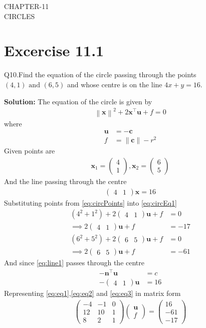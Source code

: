 \documentclass[12pt]{article}
\providecommand{\brak}[1]{\ensuremath{\left(#1\right)}}
\providecommand{\norm}[1]{\left\lVert#1\right\rVert}
\newcommand{\solution}{\noindent \textbf{Solution: }}
\newcommand{\myvec}[1]{\ensuremath{\begin{pmatrix}#1\end{pmatrix}}}
\let\vec\mathbf
\begin{document}
\begin{center}
\textbf\large{CHAPTER-11 \\ CIRCLES}

\end{center}
\section*{Excercise 11.1}

Q10.Find the equation of the circle passing through the points $\brak{4,1} \text{ and } \brak{6,5}$ and whose centre is on the line $4x + y = 16$.

\solution
The equation of the circle is given by
\begin{align}
	\label{eq:circEq1}
	\norm{\vec{x}}^2 + 2\vec{x}^\top \vec{u} + f = 0
\end{align}
where
\begin{align}
	\vec{u} &= -\vec{c}\\
	      f &= \norm{\vec{c}} - r^2
\end{align}
Given points are
\begin{align}
	\label{eq:circPoints}
	\vec{x}_{1} = \myvec{4\\1} , \vec{x}_{2} = \myvec{6\\5}
\end{align}
And the line passing through the centre
\begin{align}
	\label{eq:line1}
	\myvec{4 & 1}\vec{x} = 16
\end{align}
Substituting points from \eqref{eq:circPoints} into \eqref{eq:circEq1}
\begin{align}
	\brak{4^2 + 1^2}+2\myvec{4 & 1}\vec{u}+f&=0\\
	\label{eq:eq1}	
	\implies 2\myvec{4 & 1}\vec{u}+f&=-17\\
	\brak{6^2 + 5^2}+2\myvec{6 & 5}\vec{u}+f&=0\\
	\label{eq:eq2}
	\implies 2\myvec{6 & 5}\vec{u}+f&=-61
\end{align}
And since \eqref{eq:line1} passes through the centre
\begin{align}
	-\vec{n}^\top \vec{u} &= c\\
	\label{eq:eq3}
	-\myvec{4 & 1}\vec{u} &= 16
\end{align}
Representing \eqref{eq:eq1},\eqref{eq:eq2} and \eqref{eq:eq3} in matrix form
\begin{align}
	\myvec{-4 & -1 & 0\\
	       12 & 10 & 1\\
	        8 &  2 & 1}
	\myvec{\vec{u}\\f} = 
	\myvec{16 \\ -61 \\ -17}
\end{align}
\end{document}

